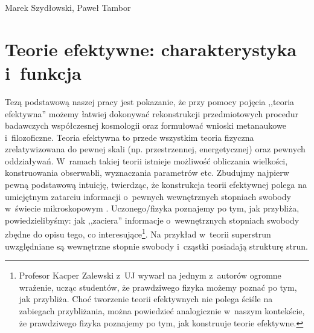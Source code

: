 \begin{artplenv2auth}{Marek Szydłowski, Paweł Tambor}
\section{Teorie efektywne: charakterystyka i~funkcja}
Tezą podstawową naszej pracy jest pokazanie, że przy pomocy pojęcia ,,teoria efektywna'' możemy łatwiej dokonywać rekonstrukcji przedmiotowych procedur badawczych współczesnej kosmologii oraz formułować wnioski metanaukowe i~filozoficzne. Teoria efektywna to przede wszystkim teoria fizyczna zrelatywizowana do pewnej skali (np. przestrzennej, energetycznej) oraz pewnych oddziaływań. W~ramach takiej teorii istnieje możliwość obliczania wielkości, konstruowania obserwabli, wyznaczania parametrów etc. Zbudujmy najpierw pewną podstawową intuicję, twierdząc, że konstrukcja teorii efektywnej polega na umiejętnym zatarciu informacji o~pewnych wewnętrznych stopniach swobody w~świecie mikroskopowym 
\parencites{morrison_modelling_1998}{morrison_approximating_2005}.
Uczonego/fizyka poznajemy po tym, jak przybliża, powiedzielibyśmy: jak ,,zaciera'' informacje o~wewnętrznych stopniach swobody zbędne do opisu tego, co interesujące\footnote{Profesor Kacper Zalewski z~UJ wywarł na jednym z~autorów ogromne wrażenie, ucząc studentów, że prawdziwego fizyka możemy poznać po tym, jak przybliża. Choć tworzenie teorii efektywnych nie polega ściśle na zabiegach przybliżania, można powiedzieć analogicznie w~naszym kontekście, że prawdziwego fizyka poznajemy po tym, jak konstruuje teorie efektywne.}. Na przykład w~teorii superstrun uwzględniane są wewnętrzne stopnie swobody i~cząstki posiadają strukturę strun.


\end{artplenv2auth}
